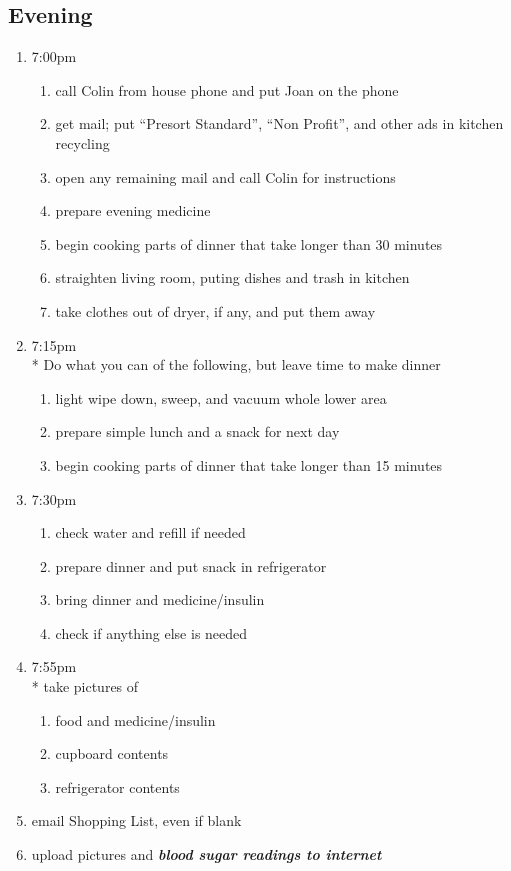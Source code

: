 \documentclass[12pt,letterpaper]{article}
\begin{document}
\begin{multicols}{2}
\subsection*{Evening}
\begin{enumerate}
	\item 7:00pm
		\begin{enumerate}
			\item call Colin from house phone and put Joan on the phone
			\item get mail; put ``Presort Standard'', ``Non Profit'', and other ads in kitchen recycling
			\item open any remaining mail and call Colin for instructions
			\item prepare evening medicine
			\item begin cooking parts of dinner that take longer than 30 minutes
			\item straighten living room, puting dishes and trash in kitchen
			\item take clothes out of dryer, if any, and put them away
		\end{enumerate}
	\item 7:15pm \\*
		Do what you can of the following, but leave time to make dinner
		\begin{enumerate}
			\item light wipe down, sweep, and vacuum whole lower area
			\item prepare simple lunch and a snack for next day
			\item begin cooking parts of dinner that take longer than 15 minutes
		\end{enumerate}
	\item 7:30pm
		\begin{enumerate}
			\item check water and refill if needed
			\item prepare dinner and put snack in refrigerator
			\item bring dinner and medicine/insulin
			\item check if anything else is needed
		\end{enumerate}
	\item 7:55pm \\*
		take pictures of 
		\begin{enumerate}
			\item food and medicine/insulin
			\item	cupboard contents
			\item	refrigerator contents
		\end{enumerate}
	\item email Shopping List, even if blank
	\item upload pictures and \textit{\textbf{blood sugar readings to internet}}
\end{enumerate}
\end{multicols}
\end{document}
